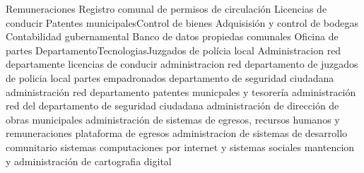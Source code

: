 
Remuneraciones
Registro comunal de permisos de circulación
Licencias de conducir
Patentes municipalesControl de bienes
Adquisisión y control de bodegas
Contabilidad gubernamental
Banco de datos propiedas comunales
Oficina de partes
DepartamentoTecnologiasJuzgados de polícia local
Administracion red departamente licencias de conducir
administracion red departamento de juzgados de policia local
partes empadronados departamento de seguridad ciudadana
administración red departamento patentes municpales y tesorería
administración red del departamento de seguridad ciudadana
administración de dirección de obras municipales
administración de sistemas de egresos, recursos humanos y remuneraciones
plataforma de egresos
administracion de sistemas de desarrollo comunitario
sistemas computaciones por internet y sistemas sociales
mantencion y administración de cartografia digital





